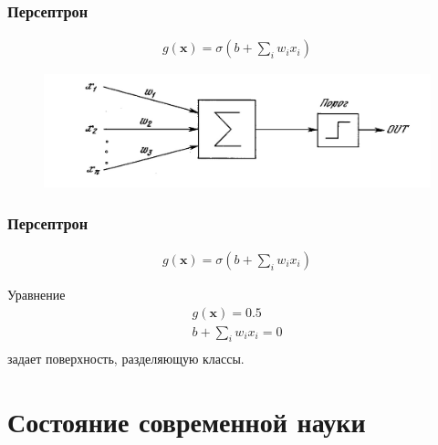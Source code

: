 \documentclass[fullscreen=true, bookmarks=false]{beamer} %
\begin{document}

\begin{frame}{}
 \frametitle{Персептрон}
\begin{gather*}
\nonumber
g(\bm{x}) = \sigma(b + \sum_i w_i x_i)
\end{gather*}

\begin{figure}[]
\includegraphics[scale=0.2]{perceptron} 
\end{figure}

\end{frame}


\begin{frame}{}
 \frametitle{Персептрон}
\begin{gather*}
\nonumber
g(\bm{x}) = \sigma(b + \sum_i w_i x_i)
\end{gather*}

Уравнение
\begin{gather*}
\nonumber
g(\bm{x}) = 0.5\\
\nonumber
b + \sum_i w_i x_i = 0\\
\end{gather*}
задает поверхность, разделяющую классы.
\end{frame}



\section{Состояние современной науки}

\end{document}
